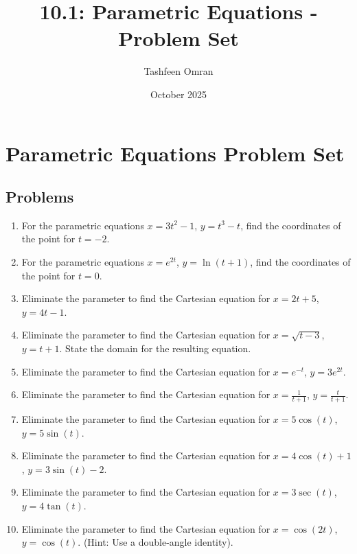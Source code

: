 \documentclass{article}
\title{10.1: Parametric Equations - Problem Set}
\author{Tashfeen Omran}
\date{October 2025}
\begin{document}
\maketitle

\section*{Parametric Equations Problem Set}

\subsection*{Problems}
\begin{enumerate}
    \item For the parametric equations $x = 3t^2 - 1$, $y = t^3 - t$, find the coordinates of the point for $t = -2$.
    \item For the parametric equations $x = e^{2t}$, $y = \ln(t+1)$, find the coordinates of the point for $t = 0$.

    \item Eliminate the parameter to find the Cartesian equation for $x = 2t + 5$, $y = 4t - 1$.
    \item Eliminate the parameter to find the Cartesian equation for $x = \sqrt{t-3}$, $y = t+1$. State the domain for the resulting equation.
    \item Eliminate the parameter to find the Cartesian equation for $x = e^{-t}$, $y = 3e^{2t}$.
    \item Eliminate the parameter to find the Cartesian equation for $x = \frac{1}{t+1}$, $y = \frac{t}{t+1}$.

    \item Eliminate the parameter to find the Cartesian equation for $x = 5\cos(t)$, $y = 5\sin(t)$.
    \item Eliminate the parameter to find the Cartesian equation for $x = 4\cos(t) + 1$, $y = 3\sin(t) - 2$.
    \item Eliminate the parameter to find the Cartesian equation for $x = 3\sec(t)$, $y = 4\tan(t)$.
    \item Eliminate the parameter to find the Cartesian equation for $x = \cos(2t)$, $y = \cos(t)$. (Hint: Use a double-angle identity).


\end{enumerate}
\end{document}
